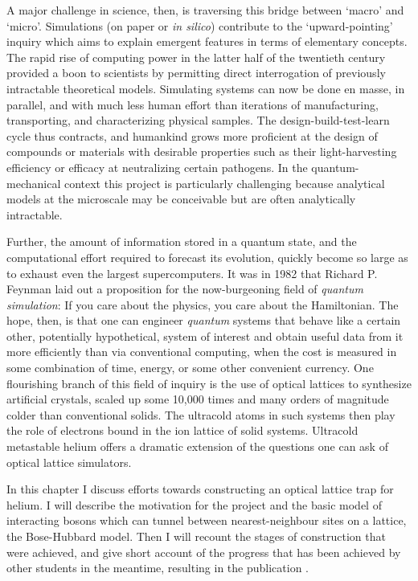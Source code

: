 	A major challenge in science, then, is traversing this bridge between `macro' and `micro'.
	Simulations (on paper or \emph{in silico}) contribute to the `upward-pointing' inquiry which aims to explain emergent features in terms of elementary concepts.
	The rapid rise of computing power in the latter half of the twentieth century provided a boon to scientists by permitting direct interrogation of previously intractable theoretical models.
	Simulating systems can now be done en masse, in parallel, and with much less human effort than iterations of manufacturing, transporting, and characterizing physical samples.
	The design-build-test-learn cycle thus contracts, and humankind grows more proficient at the design of compounds or materials with desirable properties such as their light-harvesting efficiency or efficacy at neutralizing certain pathogens.
	In the quantum-mechanical context this project is particularly challenging because analytical models at the microscale may be conceivable but are often analytically intractable.
	
	Further, the amount of information stored in a quantum state, and the computational effort required to forecast its evolution, quickly become so large as to exhaust even the largest supercomputers.
	It was in 1982 that Richard P.
	Feynman laid out a proposition for the now-burgeoning field of \emph{quantum simulation}:
	If you care about the physics, you care about the Hamiltonian.
	The hope, then, is that one can engineer \emph{quantum} systems that behave like a certain other, potentially hypothetical, system of interest and obtain useful data from it more efficiently than via conventional computing, when the cost is measured in some combination of time, energy, or some other convenient currency.
	One flourishing branch of this field of inquiry is the use of {optical lattices} to synthesize artificial crystals, scaled up some 10,000 times and many orders of magnitude colder than conventional solids.
	The ultracold atoms in such systems then play the role of electrons bound in the ion lattice of solid systems.
	Ultracold metastable helium offers a dramatic extension of the questions one can ask of optical lattice simulators.

	In this chapter I discuss efforts towards constructing an optical lattice trap for helium.
	I will describe the motivation for the project and the basic model of interacting bosons which can tunnel between nearest-neighbour sites on a lattice, the Bose-Hubbard model.
	Then I will recount the stages of construction that were achieved, and give short account of the progress that has been achieved by other students in the meantime, resulting in the publication \cite{Abbas21}.
	
